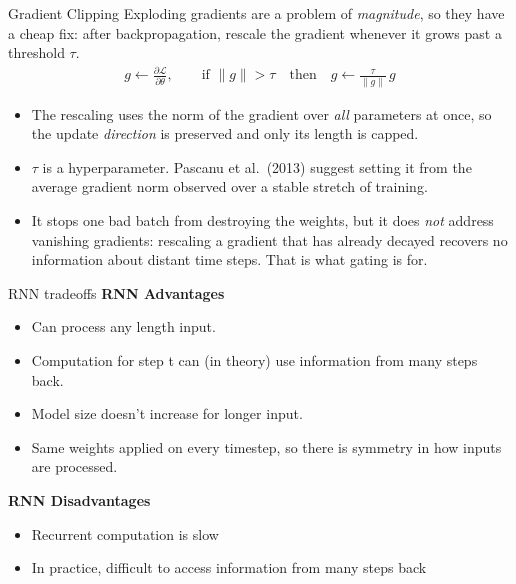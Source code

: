 \begin{frame}{Gradient Clipping}
  Exploding gradients are a problem of \emph{magnitude}, so they have a cheap fix: after
  backpropagation, rescale the gradient whenever it grows past a threshold $\tau$.
  \vspace{0.3em}
  \begin{align*}
    g \leftarrow \frac{\partial \mathcal{L}}{\partial \theta},
    \qquad \text{if } \|g\| > \tau \quad\text{then}\quad g \leftarrow \frac{\tau}{\|g\|}\, g
  \end{align*}
  \vspace{-0.3em}
  \begin{itemize}
    \item The rescaling uses the norm of the gradient over \emph{all} parameters at once, so the
      update \emph{direction} is preserved and only its length is capped.
    \item $\tau$ is a hyperparameter. Pascanu et al.\ (2013) suggest setting it from the average
      gradient norm observed over a stable stretch of training.
    \item It stops one bad batch from destroying the weights, but it does \emph{not} address
      vanishing gradients: rescaling a gradient that has already decayed recovers no information
      about distant time steps. That is what gating is for.
  \end{itemize}
\end{frame}

\begin{frame}{RNN tradeoffs}
  \textbf{RNN Advantages}
  \begin{itemize}
    \item Can process any length input.
    \item Computation for step t can (in theory) use information from many steps back.
    \item Model size doesn’t increase for longer input.
    \item Same weights applied on every timestep, so there is symmetry in how inputs
    are processed.
    \end{itemize}
    \textbf{RNN Disadvantages}
    \begin{itemize}
      \item Recurrent computation is slow
      \item In practice, difficult to access information from many steps back
      \end{itemize} 
\end{frame}
